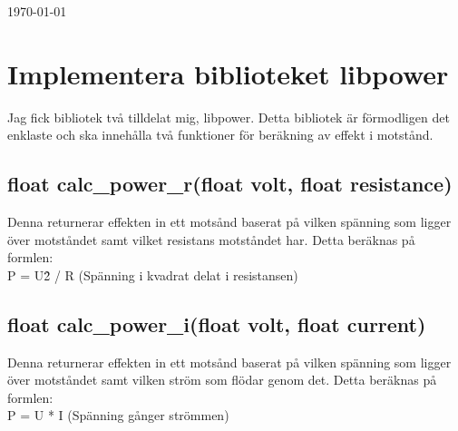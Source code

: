 \documentclass[11pt]{article}
\begin{document}
\begin{titlepage}

	\vfill\vfill\vfill %

	{\large\today} %




	\vfill %

\end{titlepage}


\section{Implementera biblioteket libpower}
Jag fick bibliotek två tilldelat mig, libpower. Detta bibliotek är förmodligen det enklaste och ska innehålla två funktioner för beräkning av effekt i motstånd. 

\subsection*{float calc\_power\_r(float volt, float resistance)}
Denna returnerar effekten in ett motsånd baserat på vilken spänning som ligger över motståndet samt vilket resistans motståndet har. Detta beräknas på formlen: \\
P = U\^2 / R (Spänning i kvadrat delat i resistansen)

\subsection*{float calc\_power\_i(float volt, float current)}
Denna returnerar effekten in ett motsånd baserat på vilken spänning som ligger över motståndet samt vilken ström som flödar genom det. Detta beräknas på formlen: \\
P = U * I  (Spänning gånger strömmen)
\end{document}
